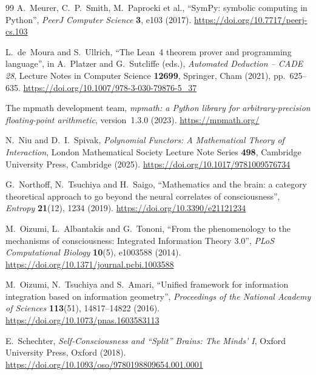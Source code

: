 \begin{thebibliography}{99}
A.~Meurer, C.~P.~Smith, M.~Paprocki et al., ``SymPy: symbolic computing in Python'', \emph{PeerJ Computer Science} \textbf{3}, e103 (2017).
\href{https://doi.org/10.7717/peerj-cs.103}{https://doi.org/10.7717/peerj-cs.103}

L.~de~Moura and S.~Ullrich, ``The Lean~4 theorem prover and programming language'', in A.~Platzer and G.~Sutcliffe (eds.), \emph{Automated Deduction -- CADE 28}, Lecture Notes in Computer Science \textbf{12699}, Springer, Cham (2021), pp.~625--635.
\href{https://doi.org/10.1007/978-3-030-79876-5_37}{https://doi.org/10.1007/978-3-030-79876-5\_37}

The mpmath development team, \emph{mpmath: a Python library for arbitrary-precision floating-point arithmetic}, version~1.3.0 (2023).
\href{https://mpmath.org/}{https://mpmath.org/}

N.~Niu and D.~I.~Spivak, \emph{Polynomial Functors: A Mathematical Theory of Interaction}, London Mathematical Society Lecture Note Series \textbf{498}, Cambridge University Press, Cambridge (2025).
\href{https://doi.org/10.1017/9781009576734}{https://doi.org/10.1017/9781009576734}

G.~Northoff, N.~Tsuchiya and H.~Saigo, ``Mathematics and the brain: a category theoretical approach to go beyond the neural correlates of consciousness'', \emph{Entropy} \textbf{21}(12), 1234 (2019).
\href{https://doi.org/10.3390/e21121234}{https://doi.org/10.3390/e21121234}

M.~Oizumi, L.~Albantakis and G.~Tononi, ``From the phenomenology to the mechanisms of consciousness: Integrated Information Theory 3.0'', \emph{PLoS Computational Biology} \textbf{10}(5), e1003588 (2014).
\href{https://doi.org/10.1371/journal.pcbi.1003588}{https://doi.org/10.1371/journal.pcbi.1003588}

M.~Oizumi, N.~Tsuchiya and S.~Amari, ``Unified framework for information integration based on information geometry'', \emph{Proceedings of the National Academy of Sciences} \textbf{113}(51), 14817--14822 (2016).
\href{https://doi.org/10.1073/pnas.1603583113}{https://doi.org/10.1073/pnas.1603583113}

E.~Schechter, \emph{Self-Consciousness and ``Split'' Brains: The Minds' I}, Oxford University Press, Oxford (2018).
\href{https://doi.org/10.1093/oso/9780198809654.001.0001}{https://doi.org/10.1093/oso/9780198809654.001.0001}


\end{thebibliography}

